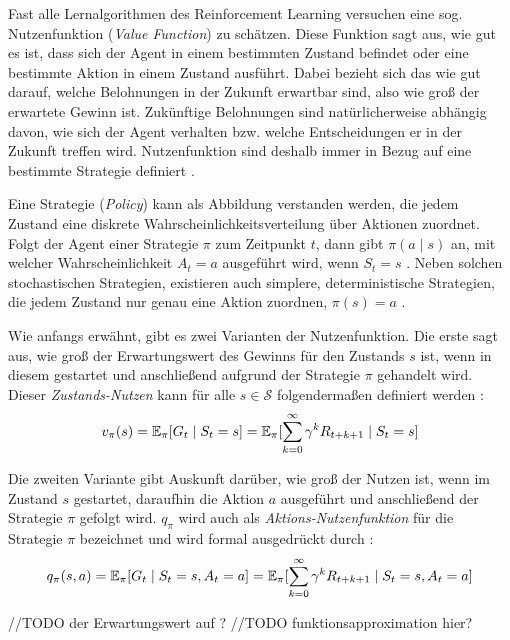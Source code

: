 Fast alle Lernalgorithmen des Reinforcement Learning versuchen eine sog. Nutzenfunktion (\textit{Value Function}) zu schätzen. Diese Funktion sagt aus, \glqq wie gut\grqq{} es ist, dass sich der Agent in einem bestimmten Zustand befindet oder eine bestimmte Aktion in einem Zustand ausführt. Dabei bezieht sich das \glqq wie gut\grqq{} darauf,
welche Belohnungen in der Zukunft erwartbar sind, also wie groß der erwartete Gewinn ist. Zukünftige Belohnungen sind natürlicherweise abhängig davon, wie sich der Agent verhalten bzw. welche Entscheidungen er in der Zukunft treffen wird. Nutzenfunktion sind deshalb immer in Bezug auf eine bestimmte Strategie definiert \cite[S.~58]{Sutton1998}.
\par 
Eine Strategie (\textit{Policy}) kann als Abbildung verstanden werden, die jedem Zustand eine diskrete Wahrscheinlichkeitsverteilung über Aktionen zuordnet. Folgt der Agent einer Strategie $\pi$ zum Zeitpunkt $t$, dann gibt $\pi(a\mid s)$ an, mit welcher Wahrscheinlichkeit $A_t = a$ ausgeführt wird, wenn $S_t = s$ \cite[S.~58]{Sutton1998}. Neben solchen stochastischen Strategien, existieren auch simplere, deterministische Strategien, die jedem Zustand nur genau eine Aktion zuordnen, $\pi (s) = a$ \cite[]{Brunskill}.
\par
Wie anfangs erwähnt, gibt es zwei Varianten der Nutzenfunktion. Die erste sagt aus, wie groß der Erwartungswert des Gewinns für den Zustands $s$ ist, wenn in diesem gestartet und anschließend aufgrund der Strategie $\pi$ gehandelt wird. Dieser \textit{Zustands-Nutzen} kann für alle $s \in \mathcal{S}$ folgendermaßen definiert werden \cite[S.~58]{Sutton1998}:
\begin{equation}\label{eq:valueFunction}
    v_\pi(s) = \operatorname{\mathbb{E}}_\pi[G_t \mid S_t = s] = \operatorname{\mathbb{E}}_\pi[\sum_{k=0}^\infty{\gamma^k R_{t+k+1} \mid S_t = s}]
\end{equation}

Die zweiten Variante gibt Auskunft darüber, wie groß der Nutzen ist, wenn im Zustand $s$ gestartet, daraufhin die Aktion $a$ ausgeführt und anschließend der Strategie $\pi$ gefolgt wird. $q_\pi$ wird auch als \textit{Aktions-Nutzenfunktion} für die Strategie $\pi$ bezeichnet und wird formal ausgedrückt durch \cite[S.~58]{Sutton1998}:
\begin{equation}\label{eq:actionValueFunction}
    q_\pi(s,a) = \operatorname{\mathbb{E}}_\pi[G_t \mid S_t = s, A_t = a] = \operatorname{\mathbb{E}}_\pi[\sum_{k=0}^\infty{\gamma^k R_{t+k+1} \mid S_t = s, A_t = a}]
\end{equation}

//TODO der Erwartungswert auf ?
//TODO funktionsapproximation hier? 
